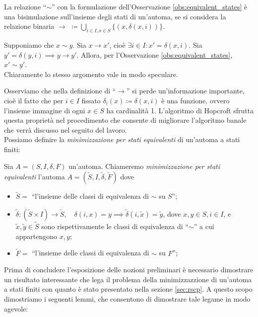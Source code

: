 \begin{observation}
    La relazione ``$\sim$'' con la formulazione dell'Osservazione \ref{obs:equivalent_states} è una bisimulazione sull'insieme degli stati di un'automa, se si considera la relazione binaria $\displaystyle \to \,\,\coloneqq \bigcup_{i \in I, x \in S} \{(x,\delta(x,i))\}$.
\end{observation}
\begin{proof2}
    Supponiamo che $x \sim y$. Sia $x \to x'$, cioè $\exists i \in I : x' = \delta(x,i)$. Sia $y' = \delta(y,i) \implies y \to y'$. Allora, per l'Osservazione \ref{obs:equivalent_states}, $x' \sim y'$.\\
    Chiaramente lo stesso argomento vale in modo speculare.
\end{proof2}
Osserviamo che nella definizione di ``$\to$'' si perde un'informazione importante, cioè il fatto che per $i \in I$ fissato $\delta_i(x) \coloneqq \delta(x,i)$ è una funzione, ovvero l'insieme immagine di ogni $x \in S$ ha cardinalità 1. L'algoritmo di Hopcroft sfrutta questa proprietà nel procedimento che consente di migliorare l'algoritmo banale che verrà discusso nel seguito del lavoro.\\
Possiamo definire la \emph{minimizzazione per stati equivalenti} di un'automa a stati finiti:
\begin{definition}\label{def:minim_eq_states}
    Sia $A = (S,I,\delta,F)$ un'automa. Chiameremo \emph{minimizzazione per stati equivalenti} l'automa $A = (\widetilde{S}, I, \widetilde{\delta}, \widetilde{F})$ dove
    \begin{itemize}
        \item $\widetilde{S} =$ ``l'insieme delle classi di equivalenza di $\sim$ su $S$'';
        \item $\widetilde{\delta} : (\widetilde{S} \times I) \to \widetilde{S}, \quad \delta(i, x) = y \implies \widetilde{\delta}(i,\widetilde{x}) = \widetilde{y}$, dove $x,y \in S, i \in I$, e $\widetilde{x}, \widetilde{y} \in \widetilde{S}$ sono rispettivamente le classi di equivalenza di ``$\sim$'' a cui appartengono $x,y$;
        \item $\widetilde{F} =$ ``l'insieme delle classi di equivalenza di $\sim$ su $F$'';
    \end{itemize}
\end{definition}
Prima di concludere l'esposizione delle nozioni preliminari è necessario dimostrare un risultato interessante che lega il problema della minimizzazzione di un'automa a stati finiti con quanto è stato presentato nella sezione \ref{sec:rscp}. A questo scopo dimostriamo i seguenti lemmi, che consentono di dimostrare tale legame in modo agevole:
